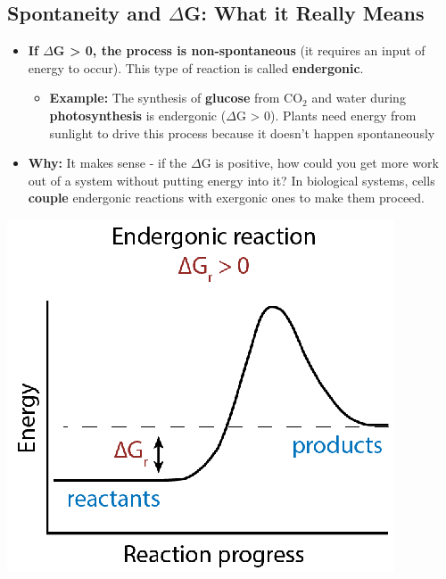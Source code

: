 \documentclass[10pt]{article}
\begin{document}
\subsection*{Spontaneity and $\Delta$G: What it Really Means}
\begin{itemize}
    \item \textbf{If $\Delta$G > 0, the process is non-spontaneous} (it requires an input of energy to occur).  This type of reaction is called \textbf{endergonic}.
    \begin{itemize}
        \item \textbf{Example:} The synthesis of \textbf{glucose} from CO$_2$ and water during \textbf{photosynthesis} is endergonic ($\Delta$G > 0).  Plants need energy from sunlight to drive this process because it doesn't happen spontaneously
    \end{itemize}
    \item \textbf{Why:} It makes sense - if the $\Delta$G is positive, how could you get more work out of a system without putting energy into it?  In biological systems, cells \textbf{couple} endergonic reactions with exergonic ones to make them proceed.
\end{itemize}
\begin{center}
    \includegraphics*[scale=0.9]{L3_9.png}
\end{center}
\end{document}
